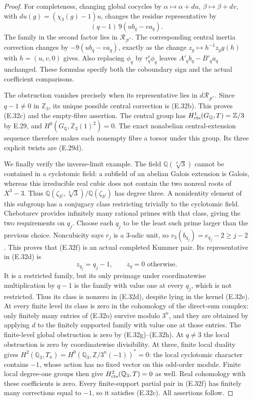 \begin{proof}
For completeness, changing global cocycles by
$\alpha\mapsto\alpha+du$, $\beta\mapsto\beta+dv$, with
$du(g)=(\chi_3(g)-1)u$, changes the residue representative by
\[
 (q-1)\,9(ub_q-va_q).
\]
The family in the second factor lies in
$\mathcal R_{\mathcal P^*}$.
The corresponding central inertia correction changes by
$-9(ub_q-va_q)$, exactly as the change
$z_g\mapsto h^{-1}z_g g(h)$ with $h=(u,v,0)$ gives.
Also replacing $\phi_q$ by
$\tau_q^r\phi_q$ leaves $A'_qb_q-B'_qa_q$ unchanged.
These formulas specify both the coboundary sign and the
actual coefficient comparisons.

The obstruction vanishes precisely when its representative
lies in $d\mathcal R_{\mathcal P^*}$. Since $q-1\ne0$ in
$\mathbb Z_3$, its unique possible central correction is
(E.32b). This proves (E.32c) and the empty-fibre assertion.
The central group has
$H^1_{\rm cts}(G_{\mathbb Q},T)=\mathbb Z/3$ by E.29,
and $H^0(G_{\mathbb Q},\mathbb Z_3(1)^2)=0$.
The exact nonabelian central-extension sequence therefore
makes each nonempty fibre a torsor under this group.
Its three explicit twists are (E.29d).

We finally verify the inverse-limit example. The field
$\mathbb Q(\sqrt[3]{3})$ cannot be contained in a cyclotomic
field: a subfield of an abelian Galois extension is Galois,
whereas this irreducible real cubic does not contain the two
nonreal roots of $X^3-3$.
Thus
$\mathbb Q(\zeta_{3^j},\sqrt[3]{3})/
 \mathbb Q(\zeta_{3^j})$
has degree three. A nonidentity element of this subgroup has
a conjugacy class restricting trivially to the cyclotomic
field. Chebotarev
\cite[V.3.23]{E_MilneCFT} provides infinitely many rational
primes with that class, giving the two requirements on $q_j$.
Choose each $q_j$ to be the least such prime larger than the
previous choice. Noncubicity says $r_j$ is a $3$-adic unit,
so $v_3(b_{q_j})=e_{q_j}-2\ge j-2$.
This proves that (E.32f) is an actual completed Kummer pair.
Its representative in (E.32d) is
\[
 z_{q_j}=q_j-1,\qquad z_q=0\text{ otherwise}.                \tag{E.32o}
\]
It is a restricted family, but its only preimage under
coordinatewise multiplication by $q-1$ is the family with
value one at every $q_j$, which is not restricted.
Thus its class is nonzero in (E.32d), despite lying in the
kernel (E.32e). At every finite level its class is zero in
the cohomology of the direct-sum complex: only finitely
many entries of (E.32o) survive modulo $3^n$, and they
are obtained by applying $d$ to the finitely supported
family with value one at those entries.
The finite-level global obstruction is zero by
(E.32g)--(E.32h). At $q\ne3$ the local obstruction is zero
by coordinatewise divisibility. At three, finite local
duality \cite[I.2.3]{E_MilneADT} gives
$H^2(\mathbb Q_3,T_n)=H^0(\mathbb Q_3,\mathbb Z/3^n(-1))^*=0$:
the local cyclotomic character contains $-1$, whose action
has no fixed vector on this odd-order module.
Finite local degree-one groups then give
$H^2_{\rm cts}(\mathbb Q_3,T)=0$ as well.
Real cohomology with these coefficients is zero.
Every finite-support partial pair in (E.32f) has finitely
many corrections equal to $-1$, so it satisfies (E.32c).
All assertions follow.
\end{proof}
